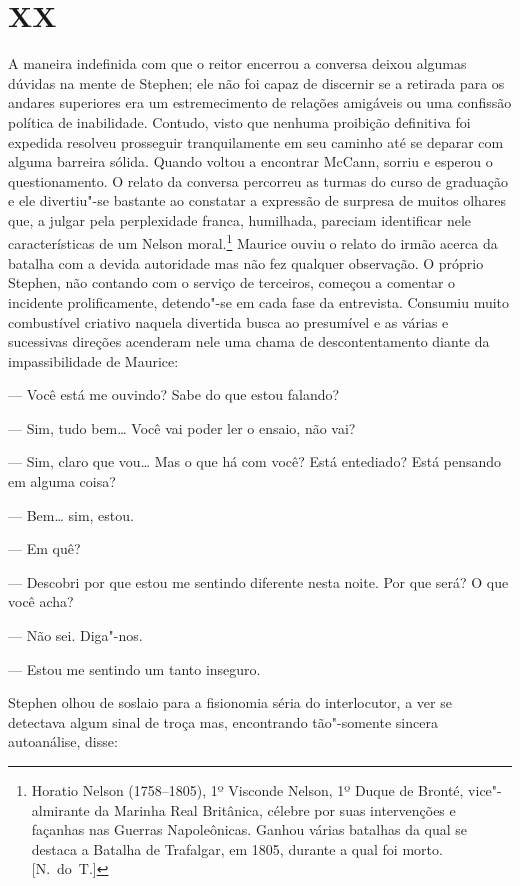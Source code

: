 \section*{XX}

A maneira indefinida com que o reitor encerrou a conversa deixou algumas
dúvidas na mente de Stephen; ele não foi capaz de discernir se a retirada para
os andares superiores era um estremecimento de relações amigáveis ou uma
confissão política de inabilidade.  Contudo, visto que nenhuma proibição
definitiva foi expedida resolveu prosseguir tranquilamente em seu caminho até
se deparar com alguma barreira sólida.  Quando voltou a encontrar McCann,
sorriu e esperou o questionamento.  O relato da conversa percorreu as turmas do
curso de graduação e ele divertiu"-se bastante ao constatar a expressão de
surpresa de muitos olhares que, a julgar pela perplexidade franca, humilhada,
pareciam identificar nele características de um Nelson moral.\footnote{ Horatio
Nelson (1758--1805), 1º Visconde Nelson, 1º Duque de Bronté, vice"-almirante da
Marinha Real Britânica, célebre por suas intervenções e façanhas nas Guerras
Napoleônicas. Ganhou várias batalhas da qual se destaca a Batalha de Trafalgar,
em 1805, durante a qual foi morto. [N.~do~T.]} Maurice ouviu o relato do irmão acerca da
batalha com a devida autoridade mas não fez qualquer observação.  O próprio
Stephen, não contando com o serviço de terceiros, começou a comentar o
incidente prolificamente, detendo"-se em cada fase da entrevista.  Consumiu
muito combustível criativo naquela divertida busca ao presumível e as várias e
sucessivas direções acenderam nele uma chama de descontentamento diante da
impassibilidade de Maurice:

--- Você está me ouvindo?  Sabe do que estou falando?

--- Sim, tudo bem\ldots{}  Você vai poder ler o ensaio, não vai?

--- Sim, claro que vou\ldots{}  Mas o que há com você?  Está entediado?  Está
pensando em alguma coisa?

--- Bem\ldots{} sim, estou.

--- Em quê?

--- Descobri por que estou me sentindo diferente nesta noite.  Por que será?  O
que você acha?

--- Não sei.  Diga"-nos.

--- Estou me sentindo um tanto inseguro.

Stephen olhou de soslaio para a fisionomia séria do interlocutor, a ver se
detectava algum sinal de troça mas, encontrando tão"-somente sincera
autoanálise, disse:

